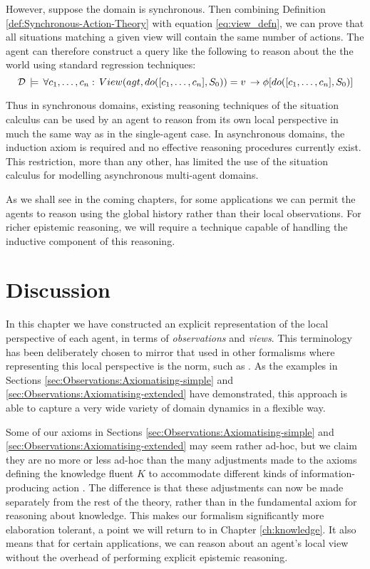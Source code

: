 However, suppose the domain is synchronous. Then combining Definition
\ref{def:Synchronous-Action-Theory} with equation \eqref{eq:view_defn},
we can prove that all situations matching a given view will contain
the same number of actions. The agent can therefore construct a query
like the following to reason about the the world using standard regression
techniques:\[
\mathcal{D}\,\models\,\forall c_{1},\dots,c_{n}:\, View(agt,do([c_{1},\dots,c_{n}],S_{0}))=v\,\rightarrow\phi[do([c_{1},\dots,c_{n}],S_{0})]\]


Thus in synchronous domains, existing reasoning techniques of the
situation calculus can be used by an agent to reason from its own
local perspective in much the same way as in the single-agent case.
In asynchronous domains, the induction axiom is required and no effective
reasoning procedures currently exist. This restriction, more than
any other, has limited the use of the situation calculus for modelling
asynchronous multi-agent domains.

As we shall see in the coming chapters, for some applications we can
permit the agents to reason using the global history rather than their
local observations. For richer epistemic reasoning, we will require
a technique capable of handling the inductive component of this reasoning.


\section{Discussion\label{sec:Observations:Discussion}}

In this chapter we have constructed an explicit representation of
the local perspective of each agent, in terms of \emph{observations}
and \emph{views}. This terminology has been deliberately chosen to
mirror that used in other formalisms where representing this local
perspective is the norm, such as \citep{parikh85dist_knowledge,halpern90knowledge_distrib}.
As the examples in Sections \ref{sec:Observations:Axiomatising-simple}
and \ref{sec:Observations:Axiomatising-extended} have demonstrated,
this approach is able to capture a very wide variety of domain dynamics
in a flexible way.

Some of our axioms in Sections \ref{sec:Observations:Axiomatising-simple}
and \ref{sec:Observations:Axiomatising-extended} may seem rather
ad-hoc, but we claim they are no more or less ad-hoc than the many
adjustments made to the axioms defining the knowledge fluent $K$
to accommodate different kinds of information-producing action \citep{shapiro98specifying_ma_systems,Lesperance99sitcalc_approach,shapiro01casl_feat_inter,Petrick06thesis,shapiro07sc_goal_change}.
The difference is that these adjustments can now be made separately
from the rest of the theory, rather than in the fundamental axiom
for reasoning about knowledge. This makes our formalism significantly
more elaboration tolerant, a point we will return to in Chapter \ref{ch:knowledge}.
It also means that for certain applications, we can reason about an
agent's local view without the overhead of performing explicit epistemic
reasoning.

